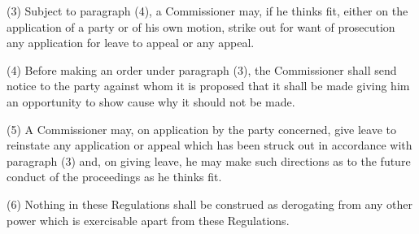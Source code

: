 \documentclass[12pt,a4paper]{article}
\begin{document}
(3) Subject to paragraph (4), a Commissioner may, if he thinks fit, either on the application of a party or of his own motion, strike out for want of prosecution any application for leave to appeal or any appeal.

(4) Before making an order under paragraph (3), the Commissioner shall send notice to the party against whom it is proposed that it shall be made giving him an opportunity to show cause why it should not be made.

(5) A Commissioner may, on application by the party concerned, give leave to reinstate any application or appeal which has been struck out in accordance with paragraph (3) and, on giving leave, he may make such directions as to the future conduct of the proceedings as he thinks fit.

(6) Nothing in these Regulations shall be construed as derogating from any other power which is exercisable apart from these Regulations.

%
%
%
%
%
%
%
%
%
%
\end{document}
